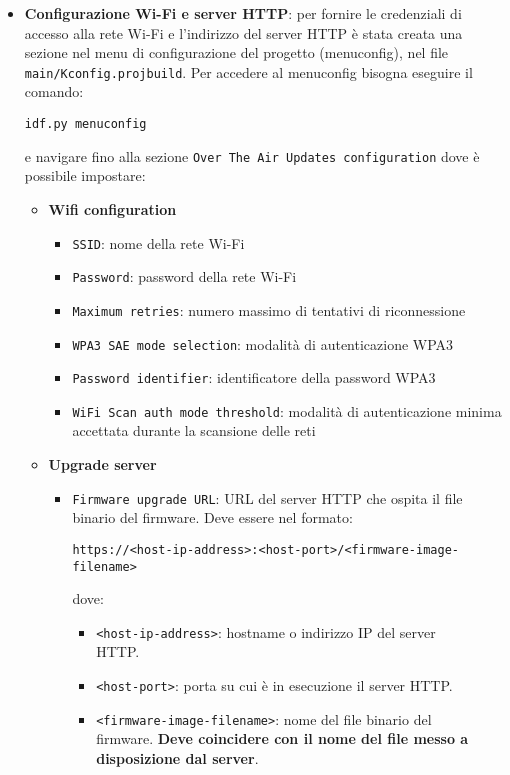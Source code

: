 \documentclass[a4paper]{article}
\begin{document}
\begin{itemize}
  \item \textbf{Configurazione Wi-Fi e server HTTP}: per fornire le credenziali di
    accesso alla rete Wi-Fi e l'indirizzo del server HTTP è stata creata una sezione
    nel menu di configurazione del progetto (menuconfig), nel file
    \texttt{main/Kconfig.projbuild}. Per accedere al menuconfig bisogna eseguire
    il comando:
\begin{lstlisting}
idf.py menuconfig
\end{lstlisting}
    e navigare fino alla sezione \texttt{Over The Air Updates configuration} dove è
    possibile impostare:
    \begin{itemize}
      \item \textbf{Wifi configuration}
        \begin{itemize}
          \item \texttt{SSID}: nome della rete Wi-Fi
          \item \texttt{Password}: password della rete Wi-Fi
          \item \texttt{Maximum retries}: numero massimo di tentativi di riconnessione
          \item \texttt{WPA3 SAE mode selection}: modalità di autenticazione WPA3
          \item \texttt{Password identifier}: identificatore della password WPA3
          \item \texttt{WiFi Scan auth mode threshold}: modalità di
            autenticazione minima accettata durante la scansione delle reti
        \end{itemize}

      \item \textbf{Upgrade server}
        \begin{itemize}
          \item \texttt{Firmware upgrade URL}: URL del server HTTP che ospita il file
            binario del firmware. Deve essere nel formato:
\begin{lstlisting}
https://<host-ip-address>:<host-port>/<firmware-image-filename>
\end{lstlisting}
            dove:
            \begin{itemize}
              \item \texttt{<host-ip-address>}: hostname o indirizzo IP del server\\ HTTP.
              \item \texttt{<host-port>}: porta su cui è in esecuzione il server HTTP.
              \item \texttt{<firmware-image-filename>}: nome del file binario del\\ firmware.
                \textbf{Deve coincidere con il nome del file messo a disposizione dal server}.
            \end{itemize}


\end{itemize}
\end{itemize}
\end{itemize}
\end{document}
